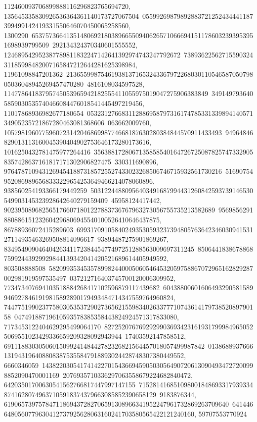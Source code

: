 {{{112460093706899888116296823765694720, 135645335830926536364361140173727067504\
05599269879892883721252434441187399499142419331550646070450065258560, 1300290\
65375736641351480692180389665509406265710666941511786032393953951698939799509\
292134324370340601555552, 124689542952387789811832247142641392974743247792672\
7389362256271559032431185998482007165847212644281625398984, 11961098847201362\
21365599875461938137165324336797226803011054658705079805036048945269457470280\
4816108034597528, 11477864183795745053965942182555411055975019047275906383849\
3491497936405859030535740466084476018541445497219456, 11017868936982677180654\
05323127668311288695879731617478533133989414057134905235721867280463081368606\
063662009760, 105798196077596072314204686998774668187630280384844570911433493\
94964846829013113160045390404902753646173280173616, 1016250432781475977264416\
35638817280671358585401647267250878257473329058357428637161817171302906827475\
330311690896, 976478710943126945418873185725527433023268506746715932561730216\
516907549520869896568333229654253649466214078060896, 938560254193366179449259\
50312244880956403491687994431260842593739146530549903145323928642640279159409\
45958124417442, 9023950896825651766071801227883736767963273056755735213582689\
9569856291880886151232604296806945540100526410646437875, 86788936072415289603\
69931709105840249353059323739480576364234603094153127114935463269508814096617\
93894487275901869267, 8349549090464042634117238445477497251288563009697311245\
850644183867886875992443929929844139342041420521689614405949592, 803508888508\
58209935345357899824400050605464532059758867072965162829287002981919597535497\
037212716403745700120006309952, 773473407694103518884268417102596879117439682\
604388006016064932905815899469278461919815892890179493484714347559764960824, 
   74477519902377580305353729027365621559834026337771074361417973852089790158\
04749188719610593578385358443824924571317833080, 7173453122404629295499064170\
82725207676929299036934231619317999849650525069551023429336659209328092943944\
17403592147858512, 6911188303050601509924148442782326821564457018057499987842\
01386889376661319431964088083875355847918893024428748307380449552, 6660346059\
14382203054174142270154366945905030564907206130904934727200998852090470001169\
2076935710336297063558679224682840472, 64203501700630541562766817447997147155\
71528141685109800184869331793933487416280749637105918374379663085852390658129\
9183876344, 61906573975784711869437282706591308966341952247961732869263709640\
6414466480560779630412737925628063160241703580565422121240160, 59707553770924\
}}}
